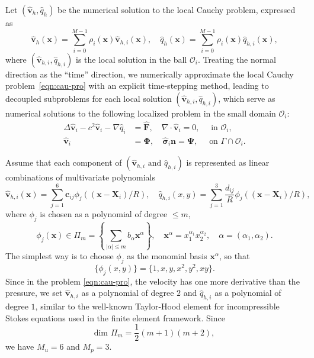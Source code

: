 \documentclass[preprint,11pt]{elsarticle}
\theoremstyle{remark}
\newcommand{\grad}[1]{\nabla #1}
\newcommand{\mc}[1]{\mathcal{#1}}
\newcommand{\wh}[1]{\widehat{#1}}
\newcommand{\bm}[1]{\boldsymbol{#1}}
\begin{document}
Let $(\wh{\bm v}_h, \wh{q}_h)$ be the numerical solution to the local Cauchy problem, expressed as
\begin{equation}
    \wh{\bm v}_h(\bm x) = \sum_{i=0}^{M-1} \rho_i(\bm x) \wh{\bm v}_{h, i}(\bm x), \quad \wh{q}_h(\bm x) = \sum_{i=0}^{M-1} \rho_i(\bm x) \wh{q}_{h, i}(\bm x),
\end{equation}
where $(\wh{\bm v}_{h,i}, \wh{q}_{h,i})$ is the local solution in the ball $\mc O_i$. Treating the normal direction as the ``time'' direction, we numerically approximate the local Cauchy problem~\eqref{eqn:cau-pro} with an explicit time-stepping method, leading to decoupled subproblems for each local solution $(\wh{\bm v}_{h,i}, \wh{q}_{h,i})$, which serve as numerical solutions to the following localized problem in the small domain $\mc O_i$:
\begin{subequations}
\begin{align}
    \Delta  \wh{\bm v}_i - c^2 \wh{\bm v}_i - \grad \wh q_i &= \wh{\bm F},\quad\grad \cdot \wh{\bm v}_i = 0,\quad \text{ in }\mc O_i, \\
    \wh{\bm v}_i &= \bm \Phi, \quad  \wh{\bm \sigma}_i \bm n = \bm \Psi, \quad \text{ on }\Gamma\cap\mc O_i.
\end{align}    
\end{subequations}

Assume that each component of $(\wh{\bm v}_{h,i} \text{ and } \wh{q}_{h,i})$ is represented as linear combinations of multivariate polynomials 
\begin{equation}
    \wh{\bm v}_{h,i}(\bm x) = \sum_{j = 1}^{6} \bm c_{ij} \phi_j((\bm x - \bm X_i)/R), \quad \wh{q}_{h,i}(x, y) = \sum_{j=1}^{3}\frac{ d_{ij}}{R} \phi_j((\bm x - \bm X_i)/R),
\end{equation}
where $\phi_j$ is chosen as a polynomial of degree $\leq m$,
\begin{equation}
    \phi_j(\bm x) \in\Pi_m = \left\{\sum_{|\alpha|\leq m }b_\alpha \bm x^\alpha \right\},\quad\bm x^\alpha = x_1^{\alpha_1} x_2^{\alpha_2}, \quad \alpha = (\alpha_1, \alpha_2).
\end{equation}
The simplest way is to choose $\phi_j$ as the monomial basis $\bm x^\alpha$, so that
\begin{equation}
\{\phi_j(x,y)\} = \{1, x, y, x^2, y^2, xy\}.
\end{equation}
Since in the problem \eqref{eqn:cau-pro}, the velocity has one more derivative than the pressure, we set $\wh{\bm v}_{h,i}$ as a polynomial of degree $2$ and $\wh{q}_{h,i}$ as a polynomial of degree $1$, similar to the well-known Taylor-Hood element for incompressible Stokes equations used in the finite element framework. Since 
\begin{equation}
    \text{dim }\Pi_m = \frac{1}{2}(m+1)(m+2),
\end{equation}
we have $M_u = 6$ and $M_p = 3$.
\end{document}
